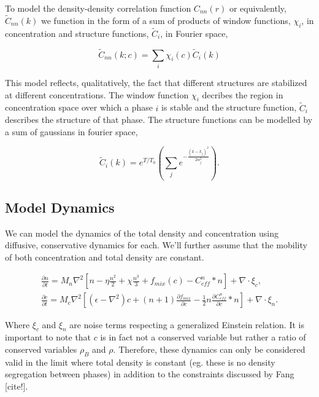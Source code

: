 \documentclass[showkeys, prb, reprint]{revtex4-1}
\newcommand{\B}{\rho_B}
\renewcommand{\l}{\left}
\renewcommand{\r}{\right}
\newcommand{\f}{\frac}
\begin{document}
To model the density-density correlation function $C_{nn}(r)$ or equivalently, $\tilde{C}_{nn}(k)$ we function in the form of a sum of products of window functions, $\chi_i$, in concentration and structure functions, $\tilde{C}_i$, in Fourier space, 

\begin{equation}
  \tilde{C}_{nn}(k; c) = \sum_i \chi_i (c) \tilde{C}_i (k)
\end{equation}

This model reflects, qualitatively, the fact that different structures are stabilized at different concentrations. The window function $\chi_i$ decribes the region in concentration space over which a phase $i$ is stable and the structure function, $\tilde{C}_i$ describes the structure of that phase. The structure functions can be modelled by a sum of gaussians in fourier space, 

\begin{equation}
  \tilde{C}_i(k) = e^{T/T_0}\l(\sum_j e^{-\f{(k - k_j)^2}{2 \alpha_j^2}}\r).
\end{equation}



\subsection{Model Dynamics}

We can model the dynamics of the total density and concentration using diffusive, conservative dynamics for each. We'll further assume that the mobility of both concentration and total density are constant. 

\begin{gather}
	\f{\partial n}{\partial t} = M_{n} \nabla^2 \l[n - \eta \f{n^2}{2} + \chi \f{n^3}{3} + f_{mix}(c) - C^n_{eff} \ast n \r] + \nabla \cdot\xi_c, \\
	\f{\partial c}{\partial t} = M_{c} \nabla^2 \l[\l(\epsilon - \nabla^2\r)c + \l(n + 1\r)\f{\partial f_{mix}}{\partial c} - \f{1}{2} n \f{\partial C^n_{eff}}{\partial c} \ast n\r] + \nabla \cdot \xi_n.
\end{gather}

Where $\xi_c$ and $\xi_n$ are noise terms respecting a generalized Einstein relation. It is important to note that $c$ is in fact not a conserved variable but rather a ratio of conserved variables $\B$ and $\rho$. Therefore, these dynamics can only be considered valid in the limit where total density is constant (eg. these is no density segregation between phases) in addition to the constraints discussed by Fang [cite!]. 
\end{document}
